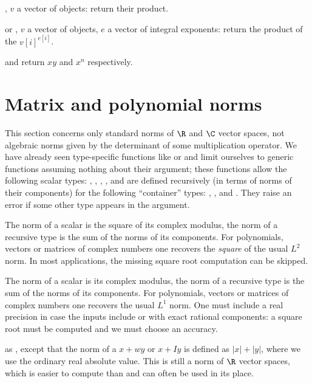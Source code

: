 \item  \kbd{[v, NULL]}, $v$ a vector of objects: return their
product.

\item or \kbd{[v, e]},  $v$ a vector of objects, $e$ a vector of integral
exponents: return the product of the $v[i]^{e[i]}$.

\noindent {} and 
return $xy$ and $x^n$ respectively.

\section{Matrix and polynomial norms} This section concerns only standard norms
of $\R$ and $\C$ vector spaces, not algebraic norms given by the determinant of
some multiplication operator. We have already seen type-specific functions like
 or  and limit ourselves to generic functions
assuming nothing about their  argument; these functions allow
the following scalar types: , , , ,
 and are defined recursively (in terms of norms of their components)
for the following ``container'' types: , ,  and
. They raise an error if some other type appears in the argument.

 The norm of a scalar is the square of its complex
modulus, the norm of a recursive type is the sum of the norms of its components.
For polynomials, vectors or matrices of complex numbers one recovers the
\emph{square} of the usual $L^2$ norm. In most applications, the missing square
root computation can be skipped.

 The norm of a scalar is its complex
modulus, the norm of a recursive type is the sum of the norms of its components.
For polynomials, vectors or matrices of complex numbers one recovers
the usual $L^1$ norm. One must include a real precision  in case
the inputs include  or  with exact rational components:
a square root must be computed and we must choose an accuracy.

 as , except that the norm
of a  $x + wy$ or  $x + Iy$ is defined as
$|x| + |y|$, where we use the ordinary real absolute value. This is still a norm
of $\R$ vector spaces, which is easier to compute than
 and can often be used in its place.

